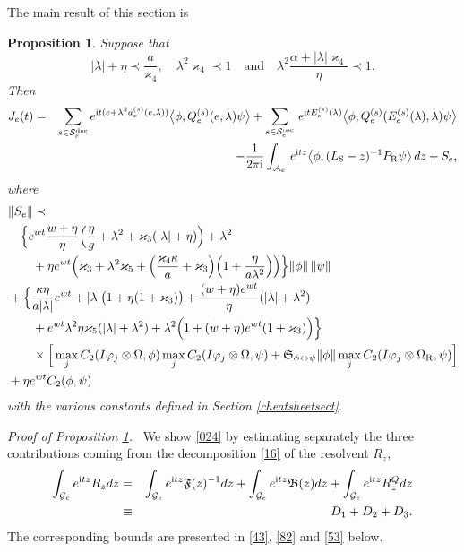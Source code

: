 \documentclass[letterpaper,onecolumn,11pt,accepted=2021-12-09]{quantumarticle}
\numberwithin{equation}{section}
\newcounter{resultcounter}[section]
\newtheorem{prop}[resultcounter]{Proposition}
\newcommand{\sym}{ {\mathfrak S}_{\phi\leftrightarrow\psi}}
\newcommand{\aes}{a_e^{(s)}}
\newcommand{\Qes}{Q_e^{(s)}}
\newcommand{\Ees}{E_e^{(s)}(\lambda)}
\renewcommand{\r}{{\rm R}}
\newcommand{\s}{{\rm S}}
\renewcommand{\i}{{\rm i}}
\begin{document}
The main result of this section is 
\begin{prop}
	\label{propm1}
Suppose that 
\begin{equation}
	\label{cond1}
|\lambda| +\eta\prec \frac{a}{\varkappa_4 },  \quad \lambda^2\varkappa_4 \prec 1\quad \mbox{and}\quad  \lambda^2 \frac{\alpha+|\lambda| \varkappa_4}{\eta} \prec 1.
\end{equation}
Then
 \begin{eqnarray}
 	\label{024}
J_e(t) &=&\sum_{s\in{\mathcal S}_e^{\rm dec}}e^{\i t (e+\lambda^2 \aes(e,\lambda))} \big\langle\phi, \Qes(e,\lambda)\psi\big\rangle +\sum_{s\in {\mathcal S}_e^{\rm osc} }  \, e^{\i t \Ees}\big\langle \phi, \Qes(\Ees,\lambda)\psi\big\rangle \nonumber\\
&&-\frac{1}{2\pi\i}\int_{{\mathcal A}_e}  \,  e^{\i t z}\big\langle\phi, (L_\s- z)^{-1}P_\r\psi\big\rangle  \, dz +S_e,
\end{eqnarray}
where
\begin{align}	
&\| S_e\| \prec \\
& \ \ \  \Big\{ e^{wt}\frac{w +\eta}{\eta} \Big( \frac{\eta}{g}+ \lambda^2+\varkappa_3 ( |\lambda|+\eta)\Big) +\lambda^2 \nonumber\\
&\qquad + \eta e^{wt}\Big( \varkappa_3+\lambda^2\varkappa_5 + \Big( \frac{\varkappa_4\kappa}{a} +\varkappa_3\Big)  \Big( 1+\frac{\eta}{a\lambda^2}\Big) \Big)\Big\} \|\phi\|\, \|\psi\|\nonumber\\
&+ \Big\{ 
 \frac{\kappa\eta}{a|\lambda|} e^{wt} + |\lambda|\big( 1 +\eta(1+\varkappa_3)\big) + \frac{(w+\eta) e^{wt}}{\eta} (|\lambda| +\lambda^2)\nonumber\\
&\qquad + e^{wt}\lambda^2\eta\varkappa_5(|\lambda|+\lambda^2)+ \lambda^2 \Big( 1+ (w+\eta) e^{wt}(1+\varkappa_3)  \Big)\Big\} \nonumber\\
& \qquad \times \Big[\max_j C_2(I\varphi_j\otimes\Omega,\phi) \max_j C_2(I\varphi_j\otimes\Omega,\psi)+  \sym \|\phi\| \max_jC_2(I\varphi_j\otimes\Omega_\r, \psi) \Big] \nonumber\\
& +\eta e^{wt} C_2(\phi,\psi)
\label{m57}
\end{align}
with the various constants  defined in Section \ref{cheatsheetsect}. 
\end{prop}

{\em Proof of Proposition \ref{propm1}.\ } We show 
\eqref{024}  by estimating separately the three contributions coming from the decomposition \eqref{16} of the resolvent $R_z$,
\begin{eqnarray}
\int_{{\mathcal G}_e} e^{\i t z} R_z dz &=& \int_{{\mathcal G}_e} e^{\i t z}{\mathfrak F}(z)^{-1} dz +\int_{{\mathcal G}_e} e^{\i t z}{\mathfrak B}(z) dz + \int_{{\mathcal G}_e} e^{\i t z}R^Q_z dz\nonumber\\
& \equiv& D_1+D_2+D_3. 
\label{16.1}
\end{eqnarray}
The corresponding bounds are presented in \eqref{43}, \eqref{82} and \eqref{53} below.
\bigskip 
 
\end{document}
